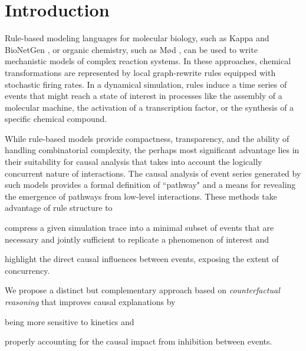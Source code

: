 \section{Introduction}


Rule-based modeling languages for molecular biology, 
such as Kappa \cite{DanosEtAl-CONCUR07} and BioNetGen \cite{bngl},
or organic chemistry, such as M{\o}d \cite{moll}, can be used to write 
mechanistic models of complex reaction systems. 
In these approaches, chemical transformations are represented by 
local graph-rewrite rules equipped with stochastic firing rates. 
In a dynamical simulation, rules induce a time series of events that might reach
a state of interest in processes like the assembly of a molecular machine, 
the activation of a transcription factor, 
or the synthesis of a specific chemical compound. 

While rule-based models provide compactness, transparency, 
and the ability of handling combinatorial complexity, 
the perhaps most significant advantage lies in their suitability for 
causal analysis that takes into account the logically 
concurrent nature of interactions. 
The causal analysis \cite{DBLP:conf/fsttcs/DanosFFHH12,DanosEtAl-CONCUR07}
of event series generated by such models provides a formal definition of 
``pathway" and a means for revealing the emergence of pathways from low-level 
interactions. These methods take advantage of rule structure to
\begin{inparaenum}[(i)]
\item compress a given simulation trace into a minimal subset of events 
that are necessary and jointly sufficient to replicate 
a phenomenon of interest and 
\item highlight the direct causal influences between events,
exposing the extent of concurrency. 
\end{inparaenum}
We propose a distinct but complementary approach based on 
\textit{counterfactual reasoning} that improves causal explanations by 
\begin{inparaenum}[(i)]
\item being more sensitive to kinetics and 
\item properly accounting for the causal impact from inhibition between events.
\end{inparaenum}